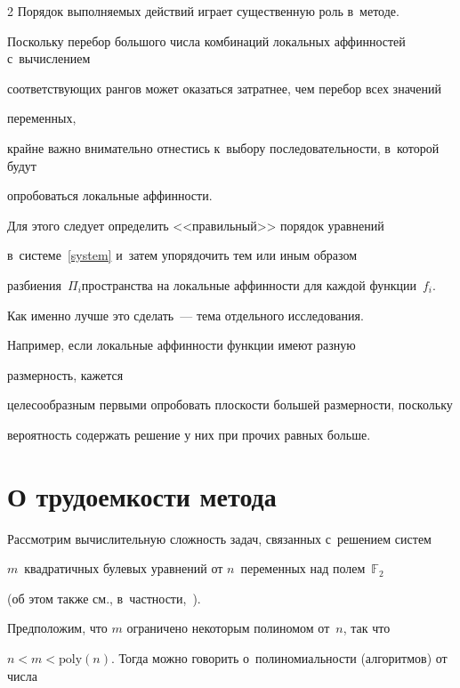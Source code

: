 \begin{multicols}{2}
Порядок выполняемых действий играет существенную роль в~методе.


Поскольку перебор большого числа комбинаций локаль\-ных аффинностей с~вычислением 


соответствующих рангов может оказаться затратнее, чем перебор всех значений 


переменных,


крайне важно внимательно отнестись к~выбору последовательности, в~которой будут 


опробоваться локальные аффинности.


Для этого следует определить <<правильный>> порядок уравнений 


в~системе~\eqref{system} и~затем упорядочить тем или иным образом 


разбиения~$\Pi_i$\linebreak пространства на локальные аффинности для каж\-дой функции~$f_i$.


Как именно лучше это сделать~--- тема отдельного исследования.


Например, если локальные аффинности функции имеют разную\linebreak


 размерность, кажется 


целесообразным первыми опробовать плоскости большей размерности, поскольку 


вероятность содержать решение у них при прочих равных больше.











\section{О трудоемкости метода}


\label{complexity}





Рассмотрим вычислительную сложность задач, связанных с~решением систем 


$m$~квадратичных булевых уравнений от $n$~переменных над полем~$\mathbb{F}_2$ 


(об этом также см., в~частности,~\cite{Gor1995}).


Предположим, что $m$ ограничено некоторым полиномом от~$n$, так что 


$n<m<\mathrm{poly}\left(n\right)$. Тогда можно говорить о~полиномиальности (алгоритмов) от числа 



\end{multicols}
